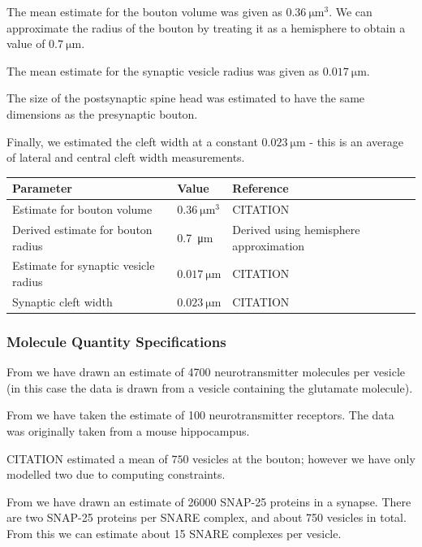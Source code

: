 \documentclass[a4paper]{article}
\begin{document}
The mean estimate for the bouton volume was given as $\SI{0.36}{\micro\meter\cubed}$. We can approximate the radius of the bouton by treating it as a hemisphere to obtain a value of $\SI{0.7}{\micro\metre}$. 

The mean estimate for the synaptic vesicle radius was given as $\SI{0.017}{\micro\meter}$.

The size of the postsynaptic spine head was estimated to have the same dimensions as the presynaptic bouton.

Finally, we estimated the cleft width at a constant $\SI{0.023}{\micro\meter}$ - this is an average of lateral and central cleft width measurements.

\begin{table}[H]
\begin{tabular}{lll}
Parameter & Value & Reference \\ \hline
Estimate for bouton volume&  $\SI{0.36}{\micro\meter\cubed}$& CITATION \\ 
Derived estimate for bouton radius & \SI{0.7}{\micro\meter} & Derived using hemisphere approximation\\
Estimate for synaptic vesicle radius & $\SI{0.017}{\micro\meter}$ & CITATION \\ 
Synaptic cleft width &$\SI{0.023}{\micro\meter}$& CITATION\\
\end{tabular}
\end{table}

\subsubsection{Molecule Quantity Specifications}
From \cite{Bruns:Nature:1995} we have drawn an estimate of 4700 neurotransmitter molecules per vesicle (in this case the data is drawn from a vesicle containing the glutamate molecule).

From \cite{Stricker:JPhysiol:1996} we have taken the estimate of 100 neurotransmitter receptors. The data was originally taken from a mouse hippocampus. 

CITATION estimated a mean of $750$ vesicles at the bouton; however we have only modelled two due to computing constraints.

From \cite{Wilhelm:Science:2014} we have drawn an estimate of 26000 SNAP-25 proteins in a synapse. There are two SNAP-25 proteins per SNARE complex, and about 750 vesicles in total. From this we can estimate about 15 SNARE complexes per vesicle. 
\end{document}
